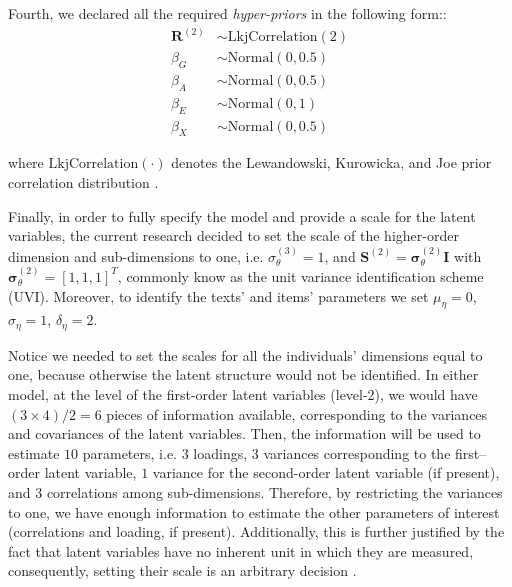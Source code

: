 Fourth, we declared all the required \textit{hyper-priors} in the following form::
%
\begin{align}
	\boldsymbol{R}^{(2)} &\sim \text{LkjCorrelation}( 2 ) \\
	\beta_{G} &\sim \text{Normal}( 0, 0.5 ) \\
	\beta_{A} &\sim \text{Normal}( 0, 0.5 ) \\
	\beta_{E} &\sim \text{Normal}( 0, 1 ) \\
	\beta_{X} &\sim \text{Normal}( 0, 0.5 ) 
\end{align}

\noindent where $\text{LkjCorrelation}(\cdot)$ denotes the Lewandowski, Kurowicka, and Joe prior correlation distribution \cite{Lewandowski_et_al_2009}. 

Finally, in order to fully specify the model and provide a scale for the latent variables, the current research decided to set the scale of the higher-order dimension and sub-dimensions to one, i.e. $\sigma^{(3)}_{\theta} = 1$, and $\mathbf{S}^{(2)} = \pmb{\sigma}^{(2)}_{\theta} \mathbf{I}$ with $\pmb{\sigma}^{(2)}_{\theta} = [1, 1, 1]^{T}$, commonly know as the unit variance identification scheme (UVI). Moreover, to identify the texts' and items' parameters we set $\mu_{\eta} = 0$, $\sigma_{\eta}=1$, $\delta_{\eta}=2$.

Notice we needed to set the scales for all the individuals' dimensions equal to one, because otherwise the latent structure would not be identified. In either model, at the level of the first-order latent variables (level-2), we would have $(3 \times 4)/2 = 6$ pieces of information available, corresponding to the variances and covariances of the latent variables. Then, the information will be used to estimate $10$ parameters, i.e. $3$ loadings, $3$ variances corresponding to the first--order latent variable, $1$ variance for the second-order latent variable (if present), and $3$ correlations among sub-dimensions. Therefore, by restricting the variances to one, we have enough information to estimate the other parameters of interest (correlations and loading, if present). Additionally, this is further justified by the fact that latent variables have no inherent unit in which they are measured, consequently, setting their scale is an arbitrary  decision \cite{Beaujean_2014}.


\begin{comment}
On the other hand, from the texts and items perspective, at the level of the items (level-2) we would have $(25 \times 26)/2 = 325$ pieces of information available, corresponding to the variances and covariances of the items dimensions. With that information we would need to estimate $30$ parameters, corresponding to $25$ items' dimension variances, and $5$ texts' dimension variances. notice in this case, we do not need to estimate $25$ loadings, as they are assumed to be $1$.
\end{comment}

